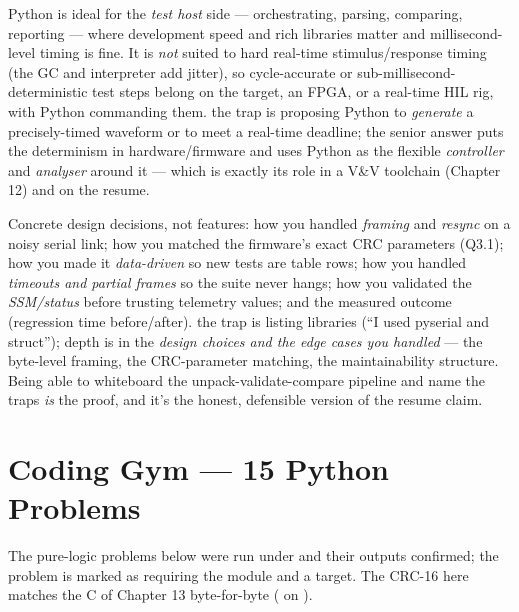 Python is ideal for the \emph{test host} side --- orchestrating, parsing,
comparing, reporting --- where development speed and rich libraries matter and
millisecond-level timing is fine. It is \emph{not} suited to hard real-time
stimulus/response timing (the GC and interpreter add jitter), so cycle-accurate
or sub-millisecond-deterministic test steps belong on the target, an FPGA, or a
real-time HIL rig, with Python commanding them. \trap the trap is proposing
Python to \emph{generate} a precisely-timed waveform or to meet a real-time
deadline; the senior answer puts the determinism in hardware/firmware and uses
Python as the flexible \emph{controller} and \emph{analyser} around it --- which
is exactly its role in a V\&V toolchain (Chapter 12) and on the resume.

Concrete design decisions, not features: how you handled \emph{framing} and
\emph{resync} on a noisy serial link; how you matched the firmware's exact CRC
parameters (Q3.1); how you made it \emph{data-driven} so new tests are table
rows; how you handled \emph{timeouts and partial frames} so the suite never
hangs; how you validated the \emph{SSM/status} before trusting telemetry values;
and the measured outcome (regression time before/after). \trap the trap is
listing libraries (``I used pyserial and struct''); depth is in the \emph{design
choices and the edge cases you handled} --- the byte-level framing, the
CRC-parameter matching, the maintainability structure. Being able to whiteboard
the unpack-validate-compare pipeline and name the traps \emph{is} the proof, and
it's the honest, defensible version of the resume claim.

\section{Coding Gym --- 15 Python Problems}

\begin{partnote}
The pure-logic problems below were run under  and their outputs
confirmed; the  problem is marked as requiring the module and a
target. The CRC-16 here matches the C  of Chapter 13 byte-for-byte
( on ).
\end{partnote}

